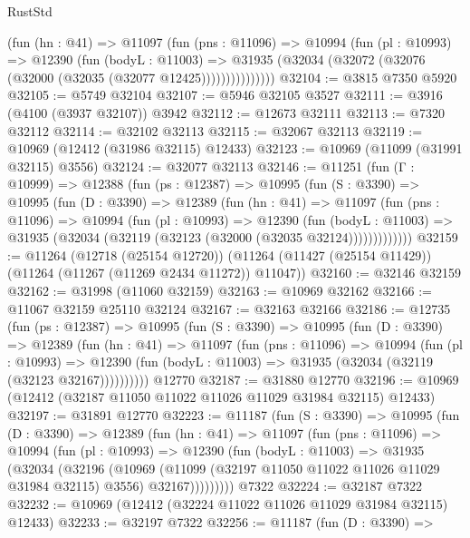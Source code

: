 \begin{lexlean}{RustStd}
\begin{coremodule}
              (fun (hn : @41) =>
              @11097
                (fun (pns : @11096) =>
                @10994
                  (fun (pl : @10993) =>
                  @12390
                    (fun (bodyL : @11003) =>
                    @31935 (@32034 (@32072 (@32076 (@32000 (@32035 (@32077 @12425)))))))))))))))
@32104 := @3815 @7350 @5920
@32105 := @5749 @32104
@32107 := @5946 @32105 @3527
@32111 := @3916 (@4100 (@3937 @32107)) @3942
@32112 := @12673 @32111
@32113 := @7320 @32112
@32114 := @32102 @32113
@32115 := @32067 @32113
@32119 := @10969 (@12412 (@31986 @32115) @12433)
@32123 := @10969 (@11099 (@31991 @32115) @3556)
@32124 := @32077 @32113
@32146 := @11251
    (fun (Γ : @10999) =>
    @12388
      (fun (ps : @12387) =>
      @10995
        (fun (S : @3390) =>
        @10995
          (fun (D : @3390) =>
          @12389
            (fun (hn : @41) =>
            @11097
              (fun (pns : @11096) =>
              @10994
                (fun (pl : @10993) =>
                @12390
                  (fun (bodyL : @11003) =>
                  @31935 (@32034 (@32119 (@32123 (@32000 (@32035 @32124)))))))))))))
@32159 := @11264
    (@12718 (@25154 @12720))
    (@11264 (@11427 (@25154 @11429)) (@11264 (@11267 (@11269 @2434 @11272)) @11047))
@32160 := @32146 @32159
@32162 := @31998 (@11060 @32159)
@32163 := @10969 @32162
@32166 := @11067 @32159 @25110 @32124
@32167 := @32163 @32166
@32186 := @12735
    (fun (ps : @12387) =>
    @10995
      (fun (S : @3390) =>
      @10995
        (fun (D : @3390) =>
        @12389
          (fun (hn : @41) =>
          @11097
            (fun (pns : @11096) =>
            @10994
              (fun (pl : @10993) =>
              @12390 (fun (bodyL : @11003) => @31935 (@32034 (@32119 (@32123 @32167))))))))))
    @12770
@32187 := @31880 @12770
@32196 := @10969 (@12412 (@32187 @11050 @11022 @11026 @11029 @31984 @32115) @12433)
@32197 := @31891 @12770
@32223 := @11187
    (fun (S : @3390) =>
    @10995
      (fun (D : @3390) =>
      @12389
        (fun (hn : @41) =>
        @11097
          (fun (pns : @11096) =>
          @10994
            (fun (pl : @10993) =>
            @12390
              (fun (bodyL : @11003) =>
              @31935
                (@32034
                  (@32196
                    (@10969
                      (@11099 (@32197 @11050 @11022 @11026 @11029 @31984 @32115) @3556)
                      @32167)))))))))
    @7322
@32224 := @32187 @7322
@32232 := @10969 (@12412 (@32224 @11022 @11026 @11029 @31984 @32115) @12433)
@32233 := @32197 @7322
@32256 := @11187
    (fun (D : @3390) =>

\end{coremodule}
\end{lexlean}
